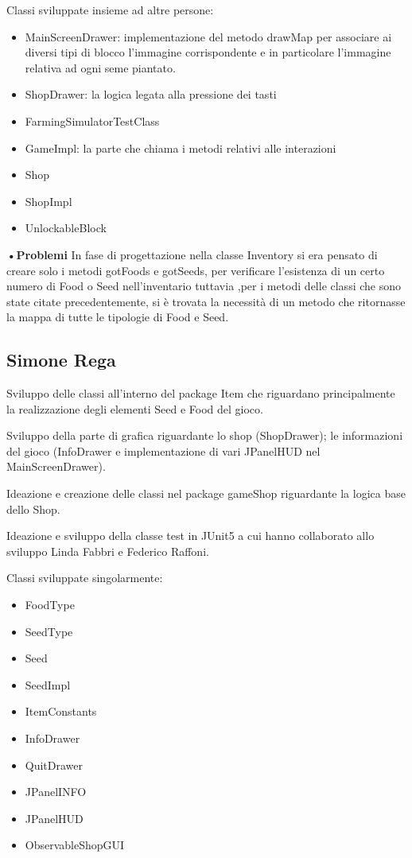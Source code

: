 \documentclass[a4paper,12pt]{report}
\begin{document}
Classi sviluppate insieme ad altre persone:
{
	\begin{itemize}
		\item MainScreenDrawer: implementazione del metodo drawMap per associare ai diversi tipi di blocco l'immagine corrispondente e in particolare l'immagine relativa ad ogni seme piantato.
		\item ShopDrawer: la logica legata alla pressione dei tasti
		\item FarmingSimulatorTestClass 
		\item GameImpl: la parte che chiama i metodi relativi alle interazioni 
		\item Shop
		\item ShopImpl
		\item UnlockableBlock
	\end{itemize}
}

\hfill\break

\textbf{•Problemi}\hfill\break
In fase di progettazione nella classe Inventory si era pensato di creare solo i metodi gotFoods e gotSeeds, per verificare l’esistenza di un certo numero di Food o Seed nell’inventario tuttavia ,per i metodi delle classi che sono state citate precedentemente, si è trovata la necessità di un metodo che ritornasse la mappa di tutte le tipologie di Food e Seed.

\subsection{Simone Rega}
Sviluppo delle classi all'interno del package Item che riguardano principalmente la realizzazione degli elementi Seed e Food del gioco.

Sviluppo della parte di grafica riguardante lo shop (ShopDrawer); le informazioni del gioco (InfoDrawer e implementazione di vari JPanelHUD nel MainScreenDrawer).

Ideazione e creazione delle classi nel package gameShop riguardante la logica base dello Shop.

Ideazione e sviluppo della classe test in JUnit5 a cui hanno collaborato allo sviluppo Linda Fabbri e Federico Raffoni.

\hfill\break
Classi sviluppate singolarmente:
{
\begin{itemize}
	\item FoodType
	\item SeedType
	\item Seed
	\item SeedImpl
	\item ItemConstants
	\item InfoDrawer
	\item QuitDrawer
	\item JPanelINFO
	\item JPanelHUD
	\item ObservableShopGUI
\end{itemize}
}
\hfill\break
\end{document}
